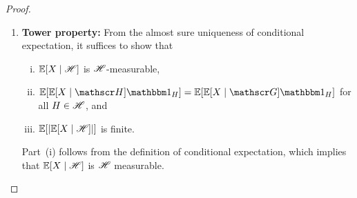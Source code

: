 \documentclass[letterpaper,10pt,english]{article}
\begin{document}
\begin{proof}
\begin{enumerate}
Part~(iii) follows from the fact that $\E\abs{XY}$ is finite and the conditional Jensen's inequality applied to convex function $\abs{\cdot} : \R \to \R_+$ to get $\abs{\E[X\mid\sG]} \le \E[\abs{X}\mid\sG]$. 
Therefore, 

%
%
%
%
\item \textbf{Tower property:} 
From the almost sure uniqueness of conditional expectation, 
it suffices to show that 
\begin{enumerate}[(i)]
\item $\mathbb{E}[X\mid\mathscr{H}]$ is $\mathscr{H}$-measurable, 
\item $\E[\E[X\mid\sH]\Ind{H}] = \E[\E[X\mid\sG]\Ind{H}]$ for all $H\in\mathscr{H}$, and 
\item $\mathbb{E}[\left\lvert\mathbb{E}[X\mid\mathscr{H}]\right\rvert]$ is finite.  
\end{enumerate}
Part~(i) follows from the definition of conditional expectation, 
which implies that $\mathbb{E}[X\mid \mathscr{H}]$ is $\mathscr{H}$ measurable. 


\end{enumerate}
\end{proof}
\end{document}

